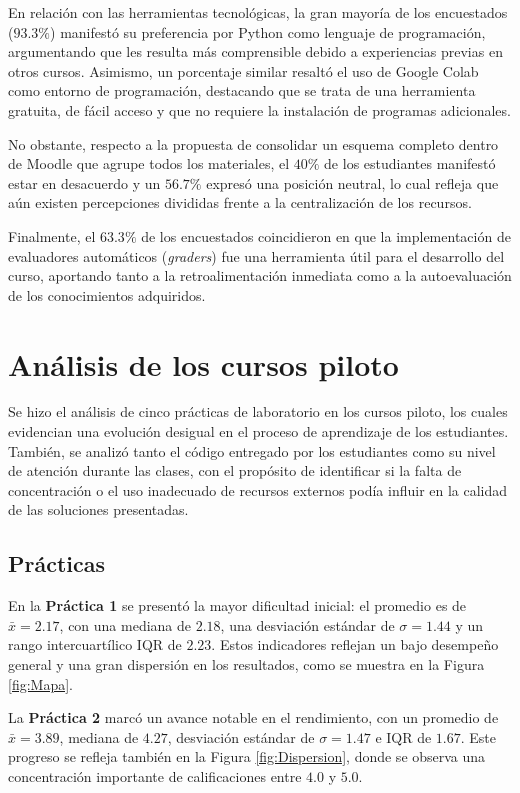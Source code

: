 \documentclass[letter,oneside,12pt,spanish]{report}
\begin{document}
En relación con las herramientas tecnológicas, la gran mayoría de los encuestados ($93.3\%$) manifestó su preferencia por Python como lenguaje de programación, argumentando que les resulta más comprensible debido a experiencias previas en otros cursos. Asimismo, un porcentaje similar resaltó el uso de Google Colab como entorno de programación, destacando que se trata de una herramienta gratuita, de fácil acceso y que no requiere la instalación de programas adicionales.

No obstante, respecto a la propuesta de consolidar un esquema completo dentro de Moodle que agrupe todos los materiales, el $40\%$ de los estudiantes manifestó estar en desacuerdo y un $56.7\%$ expresó una posición neutral, lo cual refleja que aún existen percepciones divididas frente a la centralización de los recursos.

Finalmente, el $63.3\%$ de los encuestados coincidieron en que la implementación de evaluadores automáticos (\textit{graders}) fue una herramienta útil para el desarrollo del curso, aportando tanto a la retroalimentación inmediata como a la autoevaluación de los conocimientos adquiridos.

\section{Análisis de los cursos piloto}

Se hizo el análisis de cinco prácticas de laboratorio en los cursos piloto, los cuales evidencian una evolución desigual en el proceso de aprendizaje de los estudiantes. También, se analizó tanto el código entregado por los estudiantes como su nivel de atención durante las clases, con el propósito de identificar si la falta de concentración o el uso inadecuado de recursos externos podía influir en la calidad de las soluciones presentadas. 

\subsection{Prácticas}
En la \textbf{Práctica 1} se presentó la mayor dificultad inicial: el  promedio es de $\bar{x}=2.17$, con una mediana de $2.18$, una desviación estándar de $\sigma=1.44$ y un rango intercuartílico $\text{IQR}$ de $2.23$. Estos indicadores reflejan un bajo desempeño general y una gran dispersión en los resultados, como se muestra en la Figura \ref{fig:Mapa}.

La \textbf{Práctica 2} marcó un avance notable en el rendimiento, con un promedio de $\bar{x}=3.89$, mediana de $4.27$, desviación estándar de $\sigma=1.47$ e $\text{IQR}$ de $1.67$. Este progreso se refleja también en la Figura \ref{fig:Dispersion}, donde se observa una concentración importante de calificaciones entre $4.0$ y $5.0$.
\end{document}
